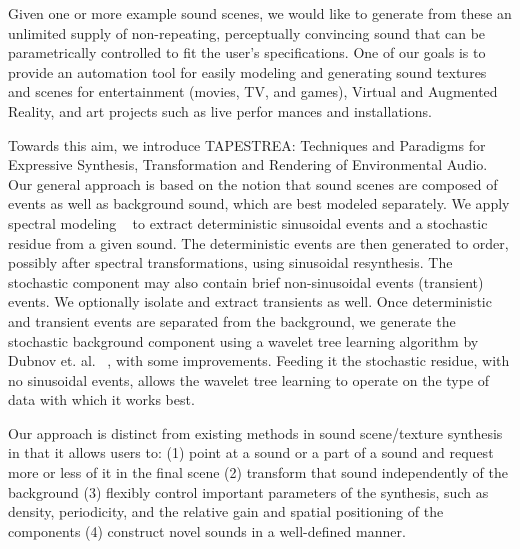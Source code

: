 \documentclass{acmsiggraph}               %
\begin{document}
Given one or more example sound scenes, we would like to generate from 
these an unlimited supply of non-repeating, perceptually convincing 
sound that can be parametrically controlled to fit the user's 
specifications. One of our goals is to provide an automation tool for 
easily modeling and generating sound textures and scenes for 
entertainment (movies, TV, and games), Virtual and Augmented Reality, 
and art projects such as live perfor mances and installations.

Towards this aim, we introduce TAPESTREA: Techniques and Paradigms for 
Expressive Synthesis, Transformation and Rendering of Environmental 
Audio. Our general approach is based on the notion that sound scenes are 
composed of events as well as background sound, which are best modeled 
separately. We apply spectral modeling ~\cite{Serra89} to extract 
deterministic sinusoidal events and a stochastic residue from a given 
sound. The deterministic events are then generated to order, possibly 
after spectral transformations, using sinusoidal resynthesis. The 
stochastic component may also contain brief non-sinusoidal events 
(transient) events.  We optionally isolate and extract transients as 
well. Once deterministic and transient events are separated from the 
background, we generate the stochastic background component using a 
wavelet tree learning algorithm by Dubnov et. al. ~, 
with some improvements. Feeding it the stochastic residue, with no 
sinusoidal events, allows the wavelet tree learning to operate on the 
type of data with which it works best.  

Our approach is distinct from existing methods in sound scene/texture synthesis in that it allows users to:
(1) point at a sound or a part of a sound and request more or less of it in the final scene
(2) transform that sound independently of the background
(3) flexibly control important parameters of the synthesis, such as density, periodicity, and the relative gain and spatial positioning of the components
(4) construct novel sounds in a well-defined manner.


\end{document}
